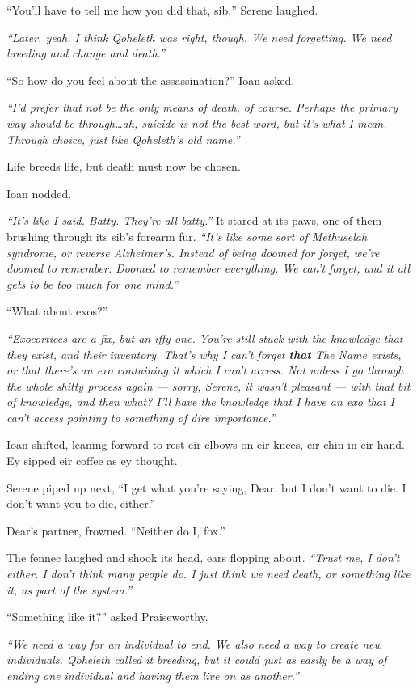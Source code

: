 ``You'll have to tell me how you did that, sib,'' Serene laughed.

\emph{``Later, yeah. I think Qoheleth was right, though. We need forgetting. We need breeding and change and death.''}

``So how do you feel about the assassination?'' Ioan asked.

\emph{``I'd prefer that not be the only means of death, of course. Perhaps the primary way should be through\ldots{}ah, suicide is not the best word, but it's what I mean. Through choice, just like Qoheleth's old name.''}

Life breeds life, but death must now be chosen.

Ioan nodded.

\emph{``It's like I said. Batty. They're all batty.''} It stared at its paws, one of them brushing through its sib's forearm fur. \emph{``It's like some sort of Methuselah syndrome, or reverse Alzheimer's. Instead of being doomed for forget, we're doomed to remember. Doomed to remember everything. We can't forget, and it all gets to be too much for one mind.''}

``What about exos?''

\emph{``Exocortices are a fix, but an iffy one. You're still stuck with the knowledge that they exist, and their inventory. That's why I can't forget \textbf{that} The Name exists, or that there's an exo containing it which I can't access. Not unless I go through the whole shitty process again --- sorry, Serene, it wasn't pleasant --- with that bit of knowledge, and then what? I'll have the knowledge that I have an exo that I can't access pointing to something of dire importance.''}

Ioan shifted, leaning forward to rest eir elbows on eir knees, eir chin in eir hand. Ey sipped eir coffee as ey thought.

Serene piped up next, ``I get what you're saying, Dear, but I don't want to die. I don't want you to die, either.''

Dear's partner, frowned. ``Neither do I, fox.''

The fennec laughed and shook its head, ears flopping about. \emph{``Trust me, I don't either. I don't think many people do. I just think we need death, or something like it, as part of the system.''}

``Something like it?'' asked Praiseworthy.

\emph{``We need a way for an individual to end. We also need a way to create new individuals. Qoheleth called it breeding, but it could just as easily be a way of ending one individual and having them live on as another.''}

